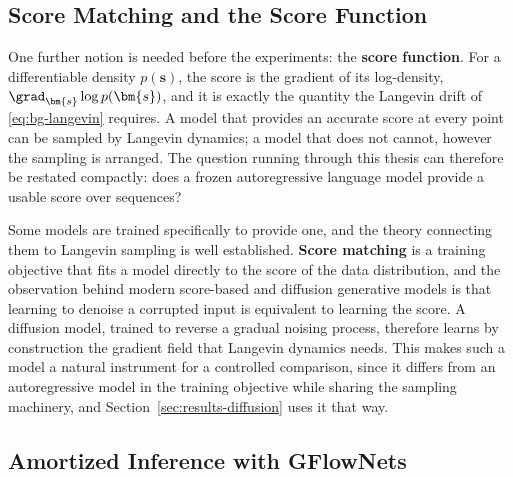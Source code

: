 \subsection{Score Matching and the Score Function}
\label{sec:bg-score}

One further notion is needed before the experiments: the \textbf{score function}. For a differentiable density $p(\bm{s})$, the score is the gradient of its log-density, $\grad_{\bm{s}} \log p(\bm{s})$, and it is exactly the quantity the Langevin drift of \eqref{eq:bg-langevin} requires. A model that provides an accurate score at every point can be sampled by Langevin dynamics; a model that does not cannot, however the sampling is arranged. The question running through this thesis can therefore be restated compactly: does a frozen autoregressive language model provide a usable score over sequences?

Some models are trained specifically to provide one, and the theory connecting them to Langevin sampling is well established. \textbf{Score matching} \citep{vincent2011connection} is a training objective that fits a model directly to the score of the data distribution, and the observation behind modern score-based and diffusion generative models \citep{song2019generative, ho2020denoising} is that learning to denoise a corrupted input is equivalent to learning the score. A diffusion model, trained to reverse a gradual noising process, therefore learns by construction the gradient field that Langevin dynamics needs. This makes such a model a natural instrument for a controlled comparison, since it differs from an autoregressive model in the training objective while sharing the sampling machinery, and Section~\ref{sec:results-diffusion} uses it that way.

\subsection{Amortized Inference with GFlowNets}
\label{sec:bg-gflownet}

